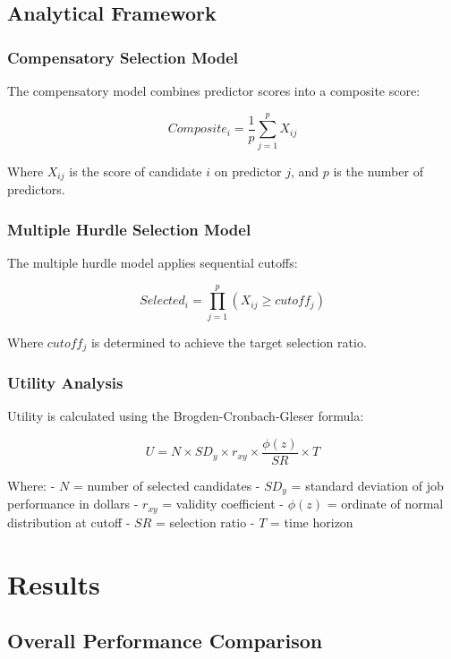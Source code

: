 \documentclass[
]{article}
\begin{document}
\subsection{Analytical Framework}\label{analytical-framework}

\subsubsection{Compensatory Selection
Model}\label{compensatory-selection-model}

The compensatory model combines predictor scores into a composite score:

\[Composite_i = \frac{1}{p}\sum_{j=1}^{p} X_{ij}\]

Where \(X_{ij}\) is the score of candidate \(i\) on predictor \(j\), and
\(p\) is the number of predictors.

\subsubsection{Multiple Hurdle Selection
Model}\label{multiple-hurdle-selection-model}

The multiple hurdle model applies sequential cutoffs:

\[Selected_i = \prod_{j=1}^{p} (X_{ij} \geq cutoff_j)\]

Where \(cutoff_j\) is determined to achieve the target selection ratio.

\subsubsection{Utility Analysis}\label{utility-analysis}

Utility is calculated using the Brogden-Cronbach-Gleser formula:

\[U = N \times SD_y \times r_{xy} \times \frac{\phi(z)}{SR} \times T\]

Where: - \(N\) = number of selected candidates - \(SD_y\) = standard
deviation of job performance in dollars - \(r_{xy}\) = validity
coefficient - \(\phi(z)\) = ordinate of normal distribution at cutoff -
\(SR\) = selection ratio - \(T\) = time horizon

\section{Results}\label{results}

\subsection{Overall Performance
Comparison}\label{overall-performance-comparison}
\end{document}
